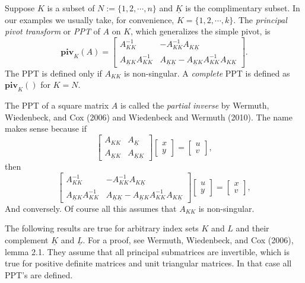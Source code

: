 \documentclass[12pt,]{article}
\begin{document}
Suppose \(K\) is a subset of \(N:=\{1,2,\cdots,n\}\) and
\(\underline{K}\) is the complimentary subset. In our examples we
usually take, for convenience, \(K=\{1,2,\cdots,k\}\). The
\emph{principal pivot transform} or \emph{PPT} of \(A\) on \(K\), which
generalizes the simple pivot, is \[
\mathbf{piv}_K(A)=\begin{bmatrix}
A_{KK}^{-1}&-A_{KK}^{-1}A_{K\underline{K}}\\
A_{\underline K K}A_{KK^{}}^{-1}&A_{\underline K\underline K}-A_{\underline K K}A_{KK^{}}^{-1}A_{K\underline{K}}
\end{bmatrix}.
\] The PPT is defined only if \(A_{KK}\) is non-singular. A
\emph{complete} PPT is defined as \(\mathbf{piv}_K()\) for \(K=N\).

The PPT of a square matrix \(A\) is called the \emph{partial inverse} by
Wermuth, Wiedenbeck, and Cox (2006) and Wiedenbeck and Wermuth (2010).
The name makes sense because if \[
\begin{bmatrix}
A_{KK}&A_{\underline K}\\
A_{\underline K K}&A_{\underline K\underline K}
\end{bmatrix}
\begin{bmatrix}
x\\y
\end{bmatrix}=
\begin{bmatrix}
u\\v
\end{bmatrix},
\] then \[
\begin{bmatrix}
A_{KK}^{-1}&-A_{KK}^{-1}A_{K\underline{K}}\\
A_{\underline K K}A_{KK^{}}^{-1}&A_{\underline K\underline K}-A_{\underline K K}A_{KK^{}}^{-1}A_{K\underline{K}}
\end{bmatrix}
\begin{bmatrix}
u\\y
\end{bmatrix}=
\begin{bmatrix}
x\\v
\end{bmatrix},
\] And conversely. Of course all this assumes that \(A_{KK}\) is
non-singular.

The following results are true for arbitrary index sets \(K\) and \(L\)
and their complement \(\underline K\) and \(\underline L\). For a proof,
see Wermuth, Wiedenbeck, and Cox (2006), lemma 2.1. They assume that all
principal submatrices are invertible, which is true for positive
definite matrices and unit triangular matrices. In that case all PPT's
are defined.
\end{document}
